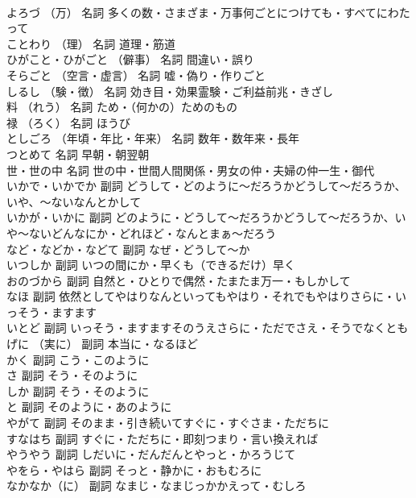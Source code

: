 \documentclass[8pt]{extreport}
\begin{document}
\begin{CJK}{UTF8}{min}
\\	よろづ	（万）	名詞	多くの数・さまざま・万事何ごとにつけても・すべてにわたって
\\	ことわり	（理）	名詞	道理・筋道
\\	ひがこと・ひがごと	（僻事）	名詞	間違い・誤り
\\	そらごと	（空言・虚言）	名詞	嘘・偽り・作りごと
\\	しるし	（験・徴）	名詞	効き目・効果霊験・ご利益前兆・きざし
\\	料	（れう）	名詞	ため・（何かの）ためのもの
\\	禄	（ろく）	名詞	ほうび
\\	としごろ	（年頃・年比・年来）	名詞	数年・数年来・長年
\\	つとめて		名詞	早朝・朝翌朝
\\	世・世の中		名詞	世の中・世間人間関係・男女の仲・夫婦の仲一生・御代
\\	いかで・いかでか		副詞	どうして・どのように～だろうかどうして～だろうか、いや、～ないなんとかして
\\	いかが・いかに		副詞	どのように・どうして～だろうかどうして～だろうか、いや～ないどんなにか・どれほど・なんとまぁ～だろう
\\	など・などか・などて		副詞	なぜ・どうして～か
\\	いつしか		副詞	いつの間にか・早くも（できるだけ）早く
\\	おのづから		副詞	自然と・ひとりで偶然・たまたま万一・もしかして
\\	なほ		副詞	依然としてやはりなんといってもやはり・それでもやはりさらに・いっそう・ますます
\\	いとど		副詞	いっそう・ますますそのうえさらに・ただでさえ・そうでなくとも
\\	げに	（実に）	副詞	本当に・なるほど
\\	かく		副詞	こう・このように
\\	さ		副詞	そう・そのように
\\	しか		副詞	そう・そのように
\\	と		副詞	そのように・あのように
\\	やがて		副詞	そのまま・引き続いてすぐに・すぐさま・ただちに
\\	すなはち		副詞	すぐに・ただちに・即刻つまり・言い換えれば
\\	やうやう		副詞	しだいに・だんだんとやっと・かろうじて
\\	やをら・やはら		副詞	そっと・静かに・おもむろに
\\	なかなか（に）		副詞	なまじ・なまじっかかえって・むしろ

\end{CJK}
\end{document}
